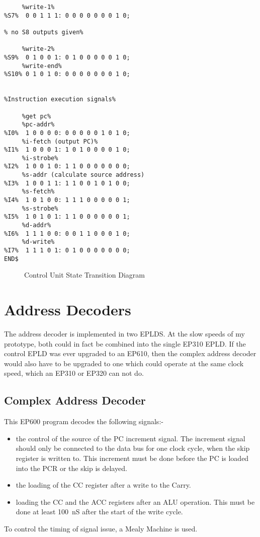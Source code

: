 \begin{verbatim}
     %write-1%
%S7%  0 0 1 1 1: 0 0 0 0 0 0 0 1 0;

% no S8 outputs given%

     %write-2%
%S9%  0 1 0 0 1: 0 1 0 0 0 0 0 1 0;
     %write-end%
%S10% 0 1 0 1 0: 0 0 0 0 0 0 0 1 0;


%Instruction execution signals%

     %get pc%
     %pc-addr%
%I0%  1 0 0 0 0: 0 0 0 0 0 1 0 1 0;
     %i-fetch (output PC)%
%I1%  1 0 0 0 1: 1 0 1 0 0 0 0 1 0;
     %i-strobe%
%I2%  1 0 0 1 0: 1 1 0 0 0 0 0 0 0;
     %s-addr (calculate source address)
%I3%  1 0 0 1 1: 1 1 0 0 1 0 1 0 0;
     %s-fetch%
%I4%  1 0 1 0 0: 1 1 1 0 0 0 0 0 1;
     %s-strobe%
%I5%  1 0 1 0 1: 1 1 0 0 0 0 0 0 1;
     %d-addr%
%I6%  1 1 1 0 0: 0 0 1 1 0 0 0 1 0;
     %d-write%
%I7%  1 1 1 0 1: 0 1 0 0 0 0 0 0 0;
END$        
\end{verbatim}
\begin{figure}
\vspace{20cm}
\caption{Control Unit State Transition Diagram}
\label{fig:statemc}
\end{figure}
\clearpage
\section{Address Decoders}
The address decoder is implemented in two EPLDS.
At the slow speeds of my prototype, both could in fact be combined into the
single EP310 EPLD.
If the control EPLD was ever upgraded to an EP610, then the complex address decoder would also have to be upgraded to one which could operate at the same clock speed, which an EP310 or EP320 can not do.

\subsection{Complex Address Decoder}
This  EP600 program decodes the following signals:-
\begin{itemize}
\item the control of the source of the PC increment signal.
The increment signal should only be connected to the data bus for one clock cycle,
when the skip register is written to.
This increment must be done before the PC is loaded into the PCR or the skip is delayed.
\item the loading of the CC register after a write to the Carry.
\item loading the CC and the ACC registers after an ALU operation.
This must be done at least 100~nS after the start of the  write cycle.
\end{itemize}
To control the timing of signal issue, a Mealy Machine is used.

